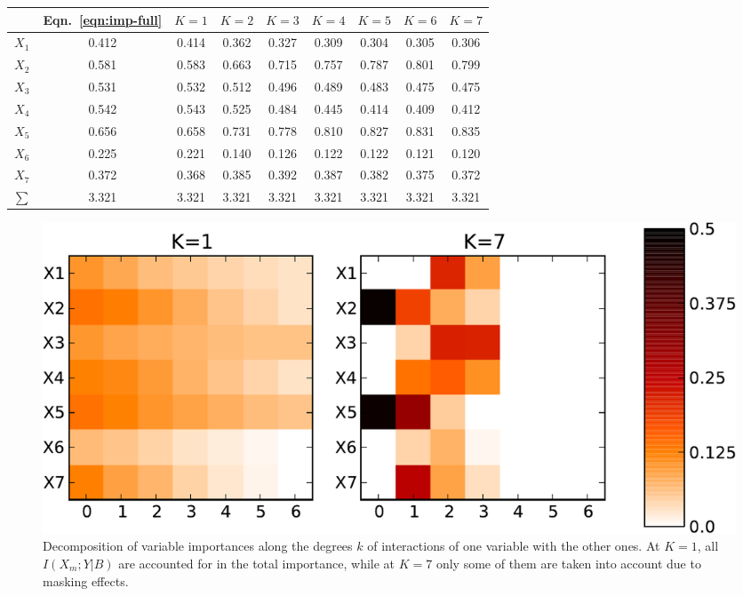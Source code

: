 \documentclass{article}
\begin{document}
\begin{table}
    \begin{tabular}{ c | c c c c c c c c }
    \hline
        & Eqn.~\ref{eqn:imp-full} & $K=1$ & $K=2$ & $K=3$ & $K=4$ & $K=5$ & $K=6$ & $K=7$ \\
    \hline
    $X_1$ & 0.412 & 0.414 & 0.362 & 0.327 & 0.309 & 0.304 & 0.305 & 0.306\\
    $X_2$ & 0.581 & 0.583 & 0.663 & 0.715 & 0.757 & 0.787 & 0.801 & 0.799\\
    $X_3$ & 0.531 & 0.532 & 0.512 & 0.496 & 0.489 & 0.483 & 0.475 & 0.475\\
    $X_4$ & 0.542 & 0.543 & 0.525 & 0.484 & 0.445 & 0.414 & 0.409 & 0.412\\
    $X_5$ & 0.656 & 0.658 & 0.731 & 0.778 & 0.810 & 0.827 & 0.831 & 0.835\\
    $X_6$ & 0.225 & 0.221 & 0.140 & 0.126 & 0.122 & 0.122 & 0.121 & 0.120\\
    $X_7$ & 0.372 & 0.368 & 0.385 & 0.392 & 0.387 & 0.382 & 0.375 & 0.372\\
    \hline
    $\sum$& 3.321 & 3.321 & 3.321 & 3.321 & 3.321 & 3.321 & 3.321 & 3.321\\
    \hline
    \end{tabular}
    \label{table:imp}
\end{table}

\begin{figure}
    \centering
    \includegraphics[scale=0.5]{imp-led.pdf}
    \caption{Decomposition of variable importances along the degrees $k$ of interactions of one variable with the other ones. At $K=1$, all $I(X_m;Y|B)$ are accounted for in the total importance, while at $K=7$ only some of them are taken into account due to masking effects.}
    \label{fig:decomposition}
\end{figure}
\end{document}
